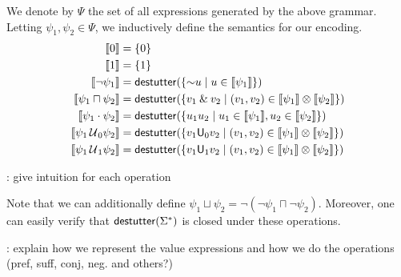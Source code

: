 We denote by $\Psi$ the set of all expressions generated by the above grammar.
Letting $\psi_1, \psi_2 \in \Psi$, we inductively define the semantics for our encoding.
\begin{align*}
		\llbracket 0 \rrbracket &=  \{ 0 \} \\
		\llbracket 1 \rrbracket &=  \{ 1 \} \\
		\llbracket \lnot \psi_1 \rrbracket &= \destutter(\{ \BitNeg u \st u \in \llbracket \psi_1 \rrbracket \}) \\
		\llbracket \psi_1 \sqcap \psi_2 \rrbracket &= \destutter(\{ v_1 \BitAnd v_2 \st (v_1,v_2) \in \llbracket \psi_1 \rrbracket \otimes \llbracket \psi_2 \rrbracket \}) \\
		\llbracket \psi_1 \cdot \psi_2 \rrbracket &= \destutter(\{ u_1 u_2 \st u_1 \in \llbracket \psi_1 \rrbracket, u_2 \in \llbracket \psi_2 \rrbracket \}) \\
		\llbracket \psi_1 \until_{\!0} \psi_2 \rrbracket &= \destutter(\{ v_1 \mathsf{U}_0 v_2  \st (v_1,v_2) \in \llbracket \psi_1 \rrbracket \otimes \llbracket \psi_2 \rrbracket \}) \\
		\llbracket \psi_1 \until_{\!1} \psi_2 \rrbracket &= \destutter(\{ v_1 \mathsf{U}_1 v_2  \st (v_1,v_2) \in \llbracket \psi_1 \rrbracket \otimes \llbracket \psi_2 \rrbracket \}) \\
\end{align*}

\TODO: give intuition for each operation

Note that we can additionally define $\psi_1 \sqcup \psi_2 = \lnot (\lnot \psi_1 \sqcap \lnot \psi_2)$.
Moreover, one can easily verify that $\mathsf{destutter}(\Sigma^*)$ is closed under these operations.

\TODO: explain how we represent the value expressions and how we do the operations (pref, suff, conj, neg. and others?)







